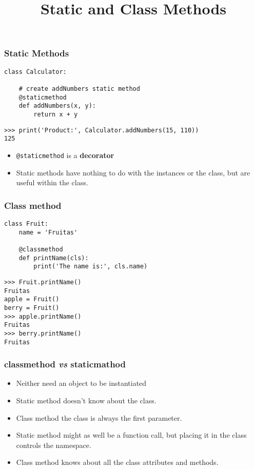 \documentclass{beamer}
\title{Static and Class Methods}
\author{}
\newcommand{\bi}{\begin{itemize}}
\newcommand{\li}{\item}
\newcommand{\ei}{\end{itemize}}
\newcommand{\bfr}[1]{\begin{frame}[fragile]\frametitle{{ #1 }}}
\begin{document}
\begin{frame}
\maketitle
\end{frame}

\bfr{Static Methods}

\begin{lstlisting}
class Calculator:

    # create addNumbers static method
    @staticmethod
    def addNumbers(x, y):
        return x + y
\end{lstlisting}

\begin{lstlisting}
>>> print('Product:', Calculator.addNumbers(15, 110))
125
\end{lstlisting}

\bi
\li \lstinline{@staticmethod} is a {\bf decorator}
\li Static methods have nothing to do with the instances
or the class, but are useful within the class.
\ei

\end{frame}

\bfr{Class method}
\begin{lstlisting}
class Fruit:
    name = 'Fruitas'

    @classmethod
    def printName(cls):
        print('The name is:', cls.name)
\end{lstlisting}
\begin{lstlisting}
>>> Fruit.printName()
Fruitas
apple = Fruit()
berry = Fruit()
>>> apple.printName()
Fruitas
>>> berry.printName()
Fruitas
\end{lstlisting}
\end{frame}

\bfr{classmethod {\em vs} staticmathod}
\bi
\li Neither need an object to be instantiated
\li Static method doesn't know about the class.
\li Class method the class is always the first parameter.
\li Static method might as well be a function call, but
placing it in the class controls the namespace.
\li Class method knows about all the class attributes
and methods.
\ei
\end{frame}
\end{document}
